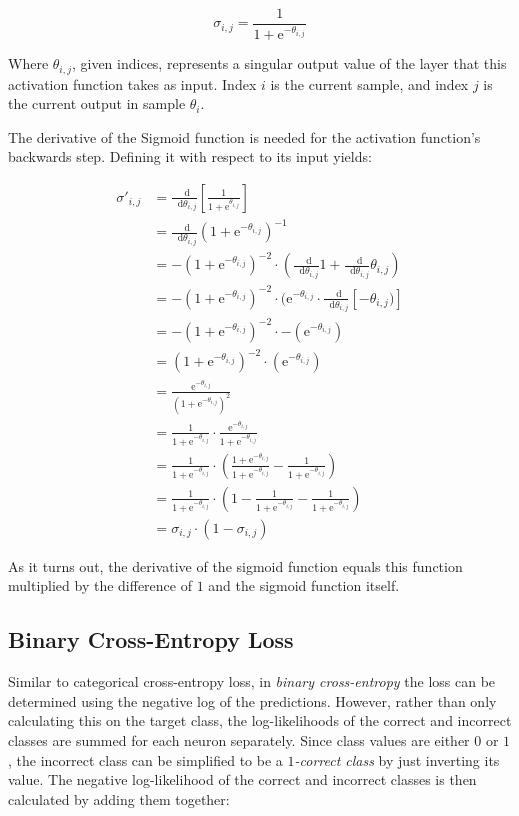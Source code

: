 \documentclass[a4paper]{report}
\newcommand{\euler}{\mathrm{e}}
\newcommand*\diff{\mathop{}\!\mathrm{d}}
\begin{document}
\begin{equation*}
    \sigma_{i,j} = \frac{1}{1 + \euler^{-\theta_{i,j}}}
\end{equation*}

Where $\theta_{i,j}$, given indices, represents a singular output value of the layer that this activation function takes as input. Index $i$ is the current sample, and index $j$ is the current output in sample $\theta_i$. 

The derivative of the Sigmoid function is needed for the activation function's backwards step. Defining it with respect to its input yields:

\begin{align*}
    \sigma'_{i,j} &= \frac{\diff}{\diff\theta_{i,j}}\left[\frac{1}{1+\euler^{\theta_{i,j}}}\right] \\
    &= \frac{\diff}{\diff\theta_{i,j}}(1+\euler^{-\theta_{i,j}})^{-1} \\
    &= -(1+\euler^{-\theta_{i,j}})^{-2} \cdot \left( \frac{\diff}{\diff\theta_{i,j}}1+\frac{\diff}{\diff\theta_{i,j}}\theta_{i,j} \right) \\
    &= -(1+\euler^{-\theta_{i,j}})^{-2} \cdot (\euler^{-\theta_{i,j}} \cdot \frac{\diff}{\diff\theta_{i,j}} [-\theta_{i,j})] \\
    &= -(1+\euler^{-\theta_{i,j}})^{-2} \cdot -(\euler^{-\theta_{i,j}}) \\
    &= (1+\euler^{-\theta_{i,j}})^{-2} \cdot (\euler^{-\theta_{i,j}}) \\
    &= \frac{\euler^{-\theta_{i,j}}}{(1+\euler^{-\theta_{i,j}})^2} \\
    &= \frac{1}{1+\euler^{-\theta_{i,j}}} \cdot \frac{\euler^{-\theta_{i,j}}}{1+\euler^{-\theta_{i,j}}} \\
    &= \frac{1}{1+\euler^{-\theta_{i,j}}} \cdot \left( \frac{1+\euler^{-\theta_{i,j}}}{1+\euler^{-\theta_{i,j}}} - \frac{1}{1+\euler^{-\theta_{i,j}}} \right) \\
    &= \frac{1}{1+\euler^{-\theta_{i,j}}} \cdot \left( 1 - \frac{1}{1+\euler^{-\theta_{i,j}}} - \frac{1}{1+\euler^{-\theta_{i,j}}} \right) \\
    &= \sigma_{i,j} \cdot (1-\sigma_{i,j})
\end{align*}

As it turns out, the derivative of the sigmoid function equals this function multiplied by the difference of $1$ and the sigmoid function itself.

\subsection*{Binary Cross-Entropy Loss}
Similar to categorical cross-entropy loss, in \emph{binary cross-entropy} the loss can be determined using the negative log of the predictions. However, rather than only calculating this on the target class, the log-likelihoods of the correct and incorrect classes are summed for each neuron separately. Since class values are either $0$ or $1$, the incorrect class can be simplified to be a \emph{$1$-correct class} by just inverting its value. The negative log-likelihood of the correct and incorrect classes is then calculated by adding them together:
\end{document}
